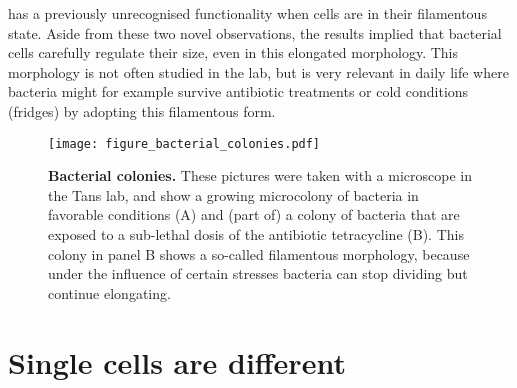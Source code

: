 has a previously unrecognised functionality when cells are in their filamentous state.
%
Aside from these two novel observations, 
the results implied that bacterial cells carefully regulate their size,
even in this elongated morphology.
%
This morphology is not often studied in the lab, 
but is very relevant in daily life where bacteria might for example survive antibiotic treatments or cold conditions (fridges) by adopting this filamentous form.
%

\begin{figure}
    \begin{minipage}[c]{0.5\textwidth}
        \texttt{[image: figure\_bacterial\_colonies.pdf]}
    \end{minipage}\hfill
    \begin{minipage}[c]{0.5\textwidth}
        \caption{ 
            \textbf{Bacterial colonies.}
            These pictures were taken with a microscope in the Tans lab, and show a growing microcolony of bacteria in favorable conditions (A) and (part of) a colony of bacteria that are exposed to a sub-lethal dosis of the antibiotic tetracycline (B). This colony in panel B shows a so-called filamentous morphology, because under the influence of certain stresses bacteria can stop dividing but continue elongating. 
        }
        \label{fig:intro:bacs}
    \end{minipage}
\end{figure}


\section{Single cells are different} 

